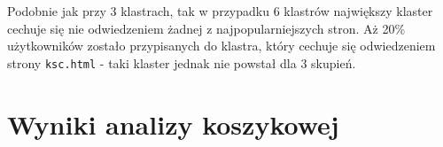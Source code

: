 \documentclass{classrep}
\begin{document}
    Podobnie jak przy 3 klastrach, tak w przypadku 6 klastrów największy klaster cechuje się nie odwiedzeniem żadnej z najpopularniejszych stron. Aż 20\% użytkowników zostało przypisanych do klastra, który cechuje się odwiedzeniem strony \verb|ksc.html| - taki klaster jednak nie powstał dla 3 skupień.


\section{Wyniki analizy koszykowej}

\begin{table}[H]
\centering
\caption{Parametry przebiegu algorytmu Apriori dla atrybutów numerycznych}
\label{tab:apriori_num_params}
\end{table}

\begin{table}[H]
\centering
\caption{Liczba obserwacji przypisanych do koszyków dla atrybutów numerycznych}
\label{tab:apriori_notequal_counter}
\end{table}
\end{document}
